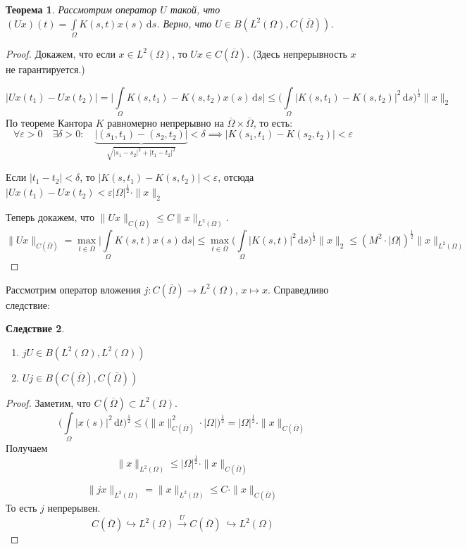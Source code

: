 \documentclass[11pt,openany,a4paper]{scrartcl}
\theoremstyle{plain}
\newtheorem{theorem}{Теорема}[subsection]
\newtheorem{corollary}[theorem]{Следствие}
\theoremstyle{definition}
\newcommand{\overto}[1]{\xrightarrow{#1}}
\newcommand{\dif}{\, \mathrm d}
\begin{document}
\begin{theorem}
    Рассмотрим оператор $U$ такой, что
    $(Ux)(t) = \int\limits_\Omega K(s,t)x(s) \dif s$. Верно, что
    $U \in B(L^2(\Omega), C(\overline\Omega))$.
\end{theorem}
\begin{proof}
    Докажем, что если $x \in L^2(\Omega)$, то $Ux \in C(\overline\Omega)$.
    (Здесь непрерывность $x$ не гарантируется.)
    
    $$
    |Ux(t_1) - Ux(t_2)| =
    \bigg|\int\limits_\Omega K(s, t_1) - K(s, t_2)x(s) \dif s\bigg| \leqslant
    \bigg(\int\limits_\Omega |K(s, t_1) - K(s, t_2)|^2 \dif s\bigg)^\frac{1}{2}
    \|x\|_2
    $$
    По теореме Кантора $K$ равномерно непрерывно на
    $\overline\Omega \times \overline\Omega$, то есть:
    $$
    \forall \varepsilon > 0\quad\exists \delta > 0:\quad
    \underbrace{|(s_1, t_1) - (s_2, t_2)|}_{\sqrt{|s_1 - s_2|^2 + |t_1 - t_2|^2}}
    < \delta \implies
    |K(s_1, t_1) - K(s_2, t_2)| < \varepsilon
    $$
    
    Если $|t_1 - t_2| < \delta$, то $|K(s, t_1) - K(s, t_2)| < \varepsilon$,
    отсюда $|Ux(t_1) - Ux(t_2) < \varepsilon |\Omega|^\frac{1}{2}\cdot \|x\|_2$
    
    Теперь докажем, что $\|Ux\|_{C(\overline\Omega)}
    \leqslant C \|x\|_{L^2(\Omega)}$.
    $$
    \|Ux\|_{C(\overline\Omega)} = \max\limits_{t \in \overline \Omega}
    \bigg| \int\limits_\Omega K(s, t)x(s) \dif s\bigg| \leqslant
    \max\limits_{t \in \overline \Omega} \bigg(\int\limits_\Omega |K(s, t)|^2
    \dif s\bigg)^\frac{1}{2} \|x\|_2 \leqslant
    (M^2 \cdot |\Omega|)^\frac{1}{2}\|x\|_{L^2(\Omega)}
    $$
\end{proof}

Рассмотрим оператор вложения $j: C(\overline\Omega) \to L^2(\Omega)$,
$x \mapsto x$. Справедливо следствие:

\begin{corollary}
    \begin{enumerate}
        \item $jU \in B(L^2(\Omega), L^2(\Omega))$
        \item $Uj \in B(C(\overline\Omega), C(\overline\Omega))$
    \end{enumerate}
\end{corollary}
\begin{proof}
    Заметим, что $C(\overline\Omega) \subset L^2(\Omega)$.
    $$
    \bigg(\int\limits_\Omega |x(s)|^2 \dif t\bigg)^\frac{1}{2} \leqslant
    \bigg(\|x\|_{C(\overline\Omega)}^2 \cdot |\Omega|\bigg)^\frac{1}{2} =
    |\Omega|^\frac{1}{2} \cdot \|x\|_{C(\overline\Omega)}
    $$
    Получаем
    $$
    \|x\|_{L^2(\Omega)} \leqslant
    |\Omega|^\frac{1}{2} \cdot \|x\|_{C(\overline\Omega)}
    $$

    $$
    \|jx\|_{L^2(\Omega)} = \|x\|_{L^2(\Omega)} \leqslant
    C \cdot \|x\|_{C(\overline\Omega)}
    $$
    То есть $j$ непрерывен.
    $$
    C(\overline\Omega) \hookrightarrow L^2(\Omega) \overto{U} C(\overline\Omega) \
    \hookrightarrow L^2(\Omega)
    $$
\end{proof}
\end{document}
